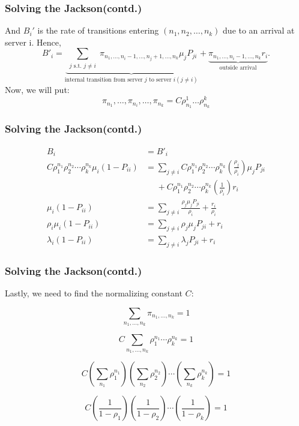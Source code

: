 \documentclass[10pt,notes]{beamer}
\begin{document}
\begin{frame}
    \frametitle{Solving the Jackson(contd.)}
    And \(B_i'\) is the rate of transitions entering \((n_1, n_2, \ldots, n_k)\) due to an arrival at server i. Hence,
    \[
        B'_i = \underbrace{\sum_{\substack{j \text{ s.t. } j \neq i}} \pi_{n_1,\ldots,n_i-1,\ldots,n_j+1,\ldots,n_k} \mu_j P_{ji}}_{\text{internal transition from server } j \text{ to server } i (j \neq i)} + \underbrace{\pi_{n_1,\ldots,n_i-1,\ldots,n_k} r_i}_{\text{outside arrival}}.
    \]
    Now, we will put:
    \[\pi_{n_1}, \ldots, \pi_{n_i}, \ldots, \pi_{n_k} = C \rho_{n_1}^{1} \ldots \rho_{n_k}^{k}\]

\end{frame}

\begin{frame}
    \frametitle{Solving the Jackson(contd.)}
    \begin{align*}
        B_i &= B'_i \\
        C \rho_1^{n_1} \rho_2^{n_2} \cdots \rho_k^{n_k} \mu_i (1 - P_{ii}) &= \sum_{j \neq i} C \rho_1^{n_1} \rho_2^{n_2} \cdots \rho_k^{n_k} \left( \frac{\rho_j}{\rho_i} \right) \mu_j P_{ji} \\
        &\phantom{=} + C \rho_1^{n_1} \rho_2^{n_2} \cdots \rho_k^{n_k} \left( \frac{1}{\rho_i} \right) r_i \\
        \mu_i (1 - P_{ii}) &= \sum_{j \neq i} \frac{\rho_j \mu_j P_{ji}}{\rho_i} + \frac{r_i}{\rho_i} \\
        \rho_i \mu_i (1 - P_{ii}) &= \sum_{j \neq i} \rho_j \mu_j P_{ji} + r_i \\
        \lambda_i (1 - P_{ii}) &= \sum_{j \neq i} \lambda_j P_{ji} + r_i
    \end{align*}

\end{frame}

\begin{frame}
    \frametitle{Solving the Jackson(contd.)}
    Lastly, we need to find the normalizing constant \( C \):

    \[
    \sum_{n_1,\ldots,n_k} \pi_{n_1,\ldots,n_k} = 1
    \]
    
    \[
    C \sum_{n_1,\ldots,n_k} \rho_1^{n_1} \cdots \rho_k^{n_k} = 1
    \]
    
    \[
    C \left( \sum_{n_1} \rho_1^{n_1} \right) \left( \sum_{n_2} \rho_2^{n_2} \right) \cdots \left( \sum_{n_k} \rho_k^{n_k} \right) = 1
    \]
    
    \[
    C \left( \frac{1}{1 - \rho_1} \right) \left( \frac{1}{1 - \rho_2} \right) \cdots \left( \frac{1}{1 - \rho_k} \right) = 1
    \]
    
\end{frame}
\end{document}

